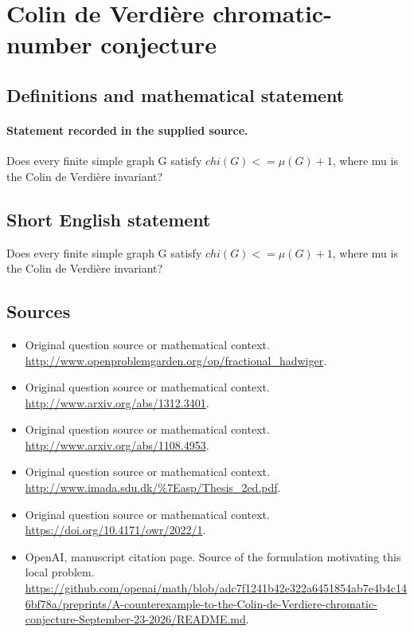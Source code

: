 \documentclass[11pt]{article}
\begin{document}
\section*{Colin de Verdière chromatic-number conjecture}\label{30007084}
\subsection{Definitions and mathematical statement}
\paragraph{Statement recorded in the supplied source.}
Does every finite simple graph G satisfy $chi(G)<=\mu (G)+1$, where mu is the Colin de Verdière invariant?
\subsection{Short English statement}
Does every finite simple graph G satisfy $chi(G)<=\mu (G)+1$, where mu is the Colin de Verdière invariant?
\subsection{Sources}
\begin{itemize}
\item[S1] Original question source or mathematical context.
\url{http://www.openproblemgarden.org/op/fractional_hadwiger}.
\item[S2] Original question source or mathematical context.
\url{http://www.arxiv.org/abs/1312.3401}.
\item[S3] Original question source or mathematical context.
\url{http://www.arxiv.org/abs/1108.4953}.
\item[S4] Original question source or mathematical context.
\url{http://www.imada.sdu.dk/%7Easp/Thesis_2ed.pdf}.
\item[S5] Original question source or mathematical context.
\url{https://doi.org/10.4171/owr/2022/1}.
\item[S6] OpenAI, manuscript citation page. Source of the formulation motivating this local problem.
\url{https://github.com/openai/math/blob/adc7f1241b42e322a6451854ab7e4b4c146bf78a/preprints/A-counterexample-to-the-Colin-de-Verdiere-chromatic-conjecture-September-23-2026/README.md}.
\end{itemize}
\end{document}
